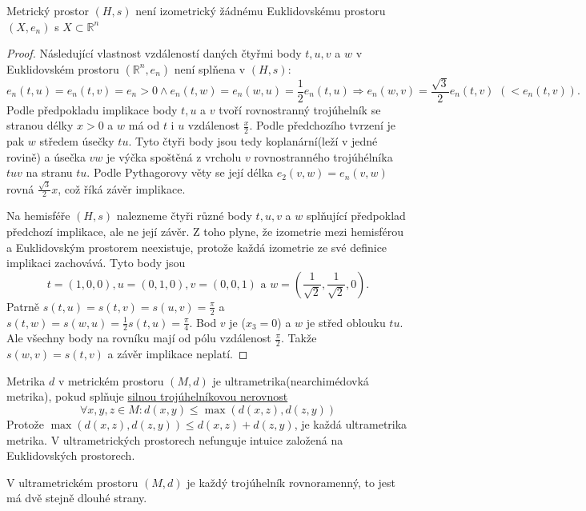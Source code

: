 \documentclass[../main.tex]{subfiles}
\begin{document}
\begin{theorem}
    Metrický prostor $(H,s)$ není izometrický žádnému Euklidovskému prostoru $(X,e_n)$ s $X \subset \mathbb{R}^n$    
\end{theorem}
\begin{proof}
    Následující vlastnost vzdáleností daných čtyřmi body $t,u,v$ a $w$ v Euklidovském prostoru $(\mathbb{R}^n, e_n)$
    není splňena v $(H,s)$:
    \[ e_n(t,u) = e_n(t,v) = e_n > 0 \land e_n(t,w) = e_n(w,u) = \frac{1}{2}e_n(t,u) \Rightarrow e_n(w,v) = \frac{\sqrt{3}}{2}e_n(t,v)\,\, (<e_n(t,v)). \]
    Podle předpokladu implikace body $t,u$ a $v$ tvoří rovnostranný trojúhelník se stranou délky $x>0$ a $w$ má od $t$ i $u$ vzdálenost $\frac{x}{2}$.
    Podle předchozího tvrzení je pak $w$ středem úsečky $tu$. Tyto čtyři body jsou tedy koplanární(leží v jedné rovině) a úsečka $vw$ je výčka spoštěná z
    vrcholu $v$ rovnostranného trojúhélníka $tuv$ na stranu $tu$. Podle Pythagorovy věty se její délka $e_2(v,w) = e_n(v,w)$ rovná $\frac{\sqrt{3}}{2}x$,
    což říká závěr implikace.

    Na hemisféře $(H,s)$ nalezneme čtyři různé body $t,u,v$ a $w$ splňující předpoklad předchozí implikace, ale ne její závěr. Z toho plyne,
    že izometrie mezi hemisférou a Euklidovským prostorem neexistuje, protože každá izometrie ze své definice implikaci zachovává.
    Tyto body jsou
    \[ t=(1,0,0),u=(0,1,0), v=(0,0,1) \,\,\text{a}\,\, w=\left(\frac{1}{\sqrt{2}}, \frac{1}{\sqrt{2}}, 0\right) . \]
    Patrně $s(t,u) = s(t,v) = s(u,v) = \frac{\pi}{2}$ a $s(t,w) = s(w,u) = \frac{1}{2}s(t,u) = \frac{\pi}{4}$.
    Bod $v$ je  ($x_3 = 0$) a $w$ je střed oblouku $tu$. Ale všechny body na rovníku mají od pólu vzdálenost $\frac{\pi}{2}$.
    Takže $s(w,v) = s(t,v)$ a závěr implikace neplatí.
\end{proof}

\begin{definition}[Ultrametrika]
    Metrika $d$ v metrickém prostoru $(M,d)$ je ultrametrika(nearchimédovká metrika),
    pokud splňuje \underline{silnou trojúhelníkovou nerovnost}
    \[ \forall x,y,z \in M: d(x,y) \leq \max(d(x,z), d(z,y)) \]
    Protože $\max(d(x,z), d(z,y)) \leq d(x,z) + d(z,y)$, je každá ultrametrika metrika.
    V ultrametrických prostorech nefunguje intuice založená na Euklidovských prostorech.
\end{definition}

\begin{lemma}
    V ultrametrickém prostoru $(M,d)$ je každý trojúhelník rovnoramenný, to jest má dvě stejně dlouhé strany.
\end{lemma}
\end{document}
